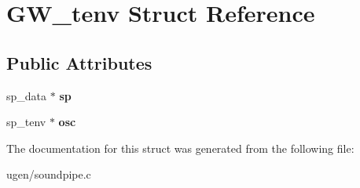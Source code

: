 \hypertarget{structGW__tenv}{}\section{G\+W\+\_\+tenv Struct Reference}
\label{structGW__tenv}
\subsection*{Public Attributes}
\begin{DoxyCompactItemize}
\item 
\hypertarget{structGW__tenv_a02cf5d03607f6421e43adb4e2c11f45e}{}\label{structGW__tenv_a02cf5d03607f6421e43adb4e2c11f45e} 
sp\+\_\+data $\ast$ {\bfseries sp}
\item 
\hypertarget{structGW__tenv_af7e36c03af99be33174e5af1eb154edb}{}\label{structGW__tenv_af7e36c03af99be33174e5af1eb154edb} 
sp\+\_\+tenv $\ast$ {\bfseries osc}
\end{DoxyCompactItemize}


The documentation for this struct was generated from the following file\+:\begin{DoxyCompactItemize}
\item 
ugen/soundpipe.\+c\end{DoxyCompactItemize}
